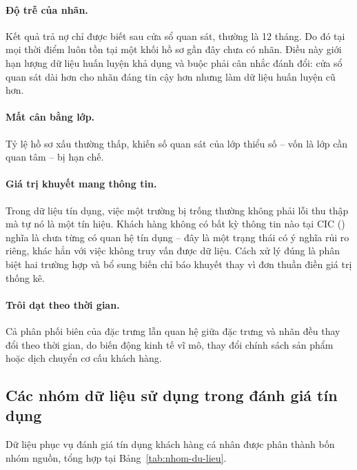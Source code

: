 \paragraph{Độ trễ của nhãn.} Kết quả trả nợ chỉ được biết sau cửa sổ quan sát,
thường là 12 tháng. Do đó tại mọi thời điểm luôn tồn tại một khối hồ sơ gần đây
chưa có nhãn. Điều này giới hạn lượng dữ liệu huấn luyện khả dụng và buộc phải
cân nhắc đánh đổi: cửa sổ quan sát dài hơn cho nhãn đáng tin cậy hơn nhưng làm dữ
liệu huấn luyện cũ hơn.

\paragraph{Mất cân bằng lớp.} Tỷ lệ hồ sơ xấu thường thấp, khiến số quan sát của
lớp thiểu số -- vốn là lớp cần quan tâm -- bị hạn chế.

\paragraph{Giá trị khuyết mang thông tin.} Trong dữ liệu tín dụng, việc một
trường bị trống thường không phải lỗi thu thập mà tự nó là một tín hiệu. Khách
hàng không có bất kỳ thông tin nào tại CIC () nghĩa là chưa từng
có quan hệ tín dụng -- đây là một trạng thái có ý nghĩa rủi ro riêng, khác hẳn
với việc không truy vấn được dữ liệu. Cách xử lý đúng là phân biệt hai
trường hợp và bổ sung biến chỉ báo khuyết thay vì đơn thuần điền giá trị thống
kê.

\paragraph{Trôi dạt theo thời gian.} Cả phân phối biên của đặc trưng lẫn quan hệ
giữa đặc trưng và nhãn đều thay đổi theo thời gian, do biến động kinh tế vĩ mô,
thay đổi chính sách sản phẩm hoặc dịch chuyển cơ cấu khách hàng.

\subsection{Các nhóm dữ liệu sử dụng trong đánh giá tín dụng}
\label{subsec:nhom-du-lieu}

Dữ liệu phục vụ đánh giá tín dụng khách hàng cá nhân được phân thành bốn nhóm
nguồn, tổng hợp tại Bảng~\ref{tab:nhom-du-lieu}.

